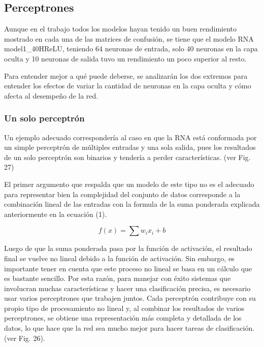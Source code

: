 \documentclass[journal]{IEEEtai}
\begin{document}
\subsection{Perceptrones}

Aunque en el trabajo todos los modelos hayan tenido un buen rendimiento mostrado en cada una de las matrices de confusión, se tiene que el modelo RNA model1\_40HReLU, teniendo 64 neuronas de entrada, solo 40 neuronas en la capa oculta y 10 neuronas de salida tuvo un rendimiento un poco superior al resto. 

Para entender mejor a qué puede deberse, se analizarán los dos extremos para entender los efectos de variar la cantidad de neuronas en la capa oculta y cómo afecta al desempeño de la red.

\subsubsection{Un solo perceptrón}

Un ejemplo adecuado correspondería al caso en que la RNA está conformada por un simple perceptrón de múltiples entradas y una sola salida, pues los resultados de un solo perceptrón son binarios y tendería a perder características. (ver Fig. 27)

El primer argumento que respalda que un modelo de este tipo no es el adecuado para representar bien la complejidad del conjunto de datos corresponde a la combinación lineal de las entradas con la formula de la suma ponderada explicada anteriormente en la ecuación (1).

\setcounter{equation}{0}
\begin{equation}
	f(x) = \sum{w_{i}x_{i}}  + b
\end{equation}

Luego de que la suma ponderada pasa por la función de activación, el resultado final se vuelve no lineal debido a la función de activación. Sin embargo, es importante tener en cuenta que este proceso no lineal se basa en un cálculo que es bastante sencillo. Por esta razón, para manejar con éxito sistemas que involucran muchas características y hacer una clasificación precisa, es necesario usar varios perceptrones que trabajen juntos. Cada perceptrón contribuye con su propio tipo de procesamiento no lineal y, al combinar los resultados de varios perceptrones, se obtiene una representación más completa y detallada de los datos, lo que hace que la red sea mucho mejor para hacer tareas de clasificación. (ver Fig. 26).
\end{document}
